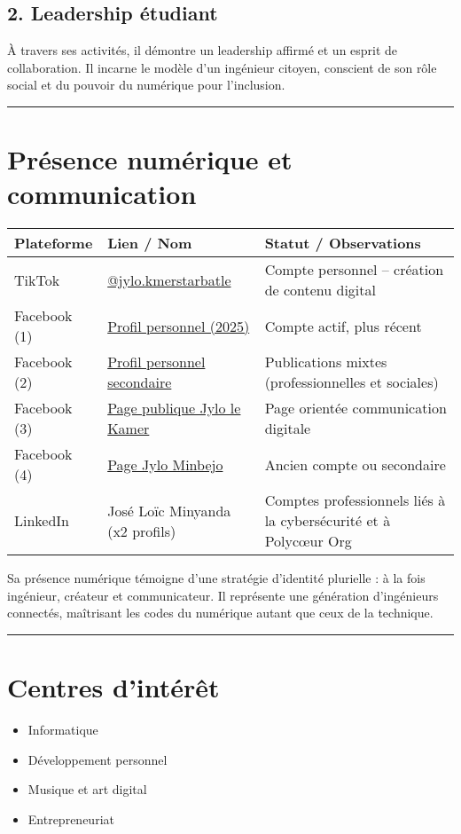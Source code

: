 \documentclass[12pt]{article}
\begin{document}
\subsection*{2. Leadership étudiant}
À travers ses activités, il démontre un leadership affirmé et un esprit de collaboration.  
Il incarne le modèle d’un ingénieur citoyen, conscient de son rôle social et du pouvoir du numérique pour l’inclusion.

\vspace{0.5cm}
\hrule
\vspace{0.5cm}

\section*{Présence numérique et communication}

\begin{center}
\begin{tabular}{|p{3cm}|p{8cm}|p{4cm}|}
\hline
\textbf{Plateforme} & \textbf{Lien / Nom} & \textbf{Statut / Observations} \\
\hline
TikTok & \href{https://vm.tiktok.com/ZMHvYLAsUXAqn-XRm8Y/}{@jylo.kmerstarbatle} & Compte personnel – création de contenu digital \\
\hline
Facebook (1) & \href{https://www.facebook.com/profile.php?id=61558227841643}{Profil personnel (2025)} & Compte actif, plus récent \\
\hline
Facebook (2) & \href{https://www.facebook.com/profile.php?id=61575315117309}{Profil personnel secondaire} & Publications mixtes (professionnelles et sociales) \\
\hline
Facebook (3) & \href{https://www.facebook.com/jlolekamer}{Page publique Jylo le Kamer} & Page orientée communication digitale \\
\hline
Facebook (4) & \href{https://www.facebook.com/jylo.minbejo}{Page Jylo Minbejo} & Ancien compte ou secondaire \\
\hline
LinkedIn & José Loïc Minyanda (x2 profils) & Comptes professionnels liés à la cybersécurité et à Polycœur Org \\
\hline
\end{tabular}
\end{center}

\vspace{0.5cm}
Sa présence numérique témoigne d’une stratégie d’identité plurielle : à la fois ingénieur, créateur et communicateur.  
Il représente une génération d’ingénieurs connectés, maîtrisant les codes du numérique autant que ceux de la technique.

\vspace{0.5cm}
\hrule
\vspace{0.5cm}

\section*{Centres d’intérêt}
\begin{itemize}
\item Informatique
\item Développement personnel
\item Musique et art digital
\item Entrepreneuriat
\end{itemize}
\end{document}
